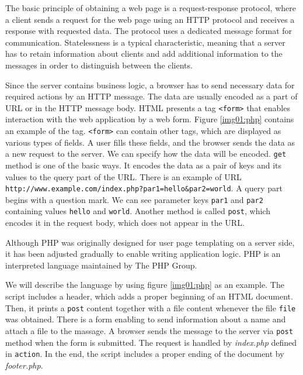 The basic principle of obtaining a web page is a request-response protocol, where a client sends a request for the web page using an HTTP protocol and receives a response with requested data.
The protocol uses a dedicated message format for communication.
Statelessness is a typical characteristic, meaning that a server has to retain information about clients and add additional information to the messages in order to distinguish between the clients.
\par
Since the server contains business logic, a browser has to send necessary data for required actions by an HTTP message.
The data are usually encoded as a part of \ac{URL} or in the HTTP message body.
HTML presents a tag \texttt{<form>} that enables interaction with the web application by a web form.
Figure \ref{img01:php} contains an example of the tag.
\texttt{<form>} can contain other tags, which are displayed as various types of fields.
A user fills these fields, and the browser sends the data as a new request to the server.
We can specify how the data will be encoded.
\texttt{get} method is one of the basic ways.
It encodes the data as a pair of keys and its values to the query part of the URL.
There is an example of URL
\texttt{http://www.example.com/index.php?par1=hello\&par2=world}.
A query part begins with a question mark.
We can see parameter keys \texttt{par1} and \texttt{par2} containing values \texttt{hello} and \texttt{world}.
Another method is called \texttt{post}, which encodes it in the request body, which does not appear in the URL.
\par
Although PHP \cite{online:phpWiki} was originally designed for user page templating on a server side, it has been adjusted gradually to enable writing application logic.
PHP is an interpreted language maintained by The PHP Group.
\par
We will describe the language by using figure \ref{img01:php} as an example.
The script includes a header, which adds a proper beginning of an HTML document.
Then, it prints a \texttt{post} content together with a file content whenever the file \texttt{file} was obtained.
There is a form enabling to send information about a name and attach a file to the massage.
A browser sends the message to the server via \texttt{post} method when the form is submitted.
The request is handled by \textit{index.php} defined in \texttt{action}.
In the end, the script includes a proper ending of the document by \textit{footer.php}.
\par
